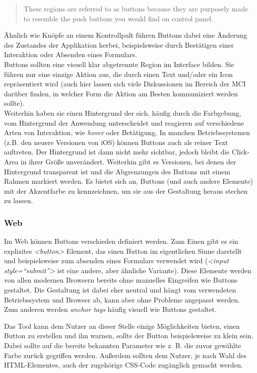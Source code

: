 \begin{quote}
These regions are referred to as buttons because they are purposely made to resemble the push buttons you would find on control panel. \cite{dix2009human}
\end{quote}

Ähnlich wie Knöpfe an einem Kontrollpult führen Buttons dabei eine Änderung des Zustandes der Applikation herbei, beispielsweise durch Bestätigen einer Interaktion oder Absenden eines Formulars. \\
Buttons sollten eine visuell klar abgetrennte Region im Interface bilden. Sie führen nur eine einzige Aktion aus, die durch einen Text und/oder ein Icon repräsentiert wird (auch hier lassen sich viele Diskussionen im Bereich der MCI darüber finden, in welcher Form die Aktion am Besten kommuniziert werden sollte). \\
Weiterhin haben sie einen Hintergrund der sich, häufig durch die Farbgebung, vom Hintergrund der Anwendung unterscheidet und reagieren auf verschiedene Arten von Interaktion, wie \textit{hover} oder Betätigung.
In manchen Betriebssystemen (z.B. den neuere Versionen von iOS) können Buttons auch als reiner Text auftreten. Der Hintergrund ist dann nicht mehr sichtbar, jedoch bleibt die Click-Area in ihrer Größe unverändert. Weiterhin gibt es Versionen, bei denen der Hintergrund transparent ist und die Abgrenzungen des Buttons mit einem Rahmen markiert werden.
Es bietet sich an, Buttons (und auch andere Elemente) mit der Akzentfarbe zu kennzeichnen, um sie aus der Gestaltung heraus stechen zu lassen.

\subsubsection{Web}
Im Web können Buttons verschieden definiert werden. Zum Einen gibt es ein explizites \textit{<button>} Element, das einen Button im eigentlichen Sinne darstellt und beispielsweise zum absenden eines Formulars verwendet wird (\textit{<input style=“submit”>} ist eine andere, aber ähnliche Variante). Diese Elemente werden von allen modernen Browsern bereits ohne manuelles Eingreifen wie Buttons gestaltet. Die Gestaltung ist dabei eher neutral und hängt vom verwendeten Betriebssystem und Browser ab, kann aber ohne Probleme angepasst werden. \\
Zum anderen werden \textit{anchor tags} häufig visuell wie Buttons gestaltet.

Das Tool kann dem Nutzer an dieser Stelle einige Möglichkeiten bieten, einen Button zu erstellen und ihn warnen, sollte der Button beispielsweise zu klein sein. Dabei sollte auf die bereits bekannten Parameter wie z. B. die zuvor gewählte Farbe zurück gegriffen werden. Außerdem sollten dem Nutzer, je nach Wahl des HTML-Elementes, auch der zugehörige CSS-Code zugänglich gemacht werden.


